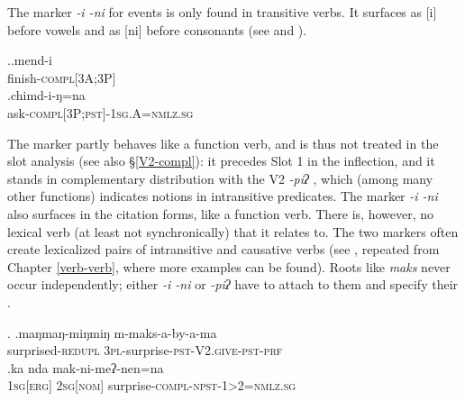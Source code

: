  The marker  \emph{-i \ti -ni} for  events is only found in transitive verbs. It surfaces as [i] before vowels and as [ni] before consonants (see \Next and \NNext). 
 
 \ex.\ag.mend-i\\
 finish{\scshape -compl[3A;3P]}\\
 \bg.chimd-i-ŋ=na\\
ask{\scshape -compl[3P;pst]-1sg.A=nmlz.sg}\\
 
The marker partly behaves like a function verb, and is thus not treated in the slot analysis (see also §\ref{V2-compl}): it precedes Slot 1 in the inflection, and it stands in complementary distribution with the V2 \emph{-piʔ} , which (among many other functions) indicates  notions in intransitive  predicates. The marker \emph{-i \ti -ni} also surfaces in the citation forms, like a function verb. There is, however, no lexical verb (at least not synchronically) that it relates to. The two markers often create lexicalized pairs of intransitive and causative verbs (see \Next, repeated from Chapter \ref{verb-verb}, where more examples can be found). Roots like \emph{maks}  never occur independently; either \emph{-i \ti -ni} or \emph{-piʔ} have to attach to them and specify their . 

 
\ex. \ag.maŋmaŋ-miŋmiŋ m-maks-a-by-a-ma\\
	surprised{\scshape -redupl} {\scshape 3pl-}surprise{\scshape -pst-V2.give-pst-prf}\\
	 
 	\bg.ka nda mak-ni-meʔ-nen=na\\
	{\scshape 1sg[erg]} {\scshape 2sg[nom]} surprise{\scshape -compl-npst-1>2=nmlz.sg}		\\
	

 
 
 
 
